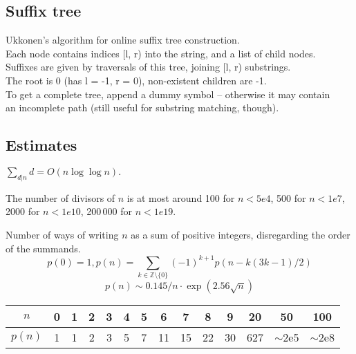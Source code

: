 \documentclass{article}
\begin{document}
  \subsection*{Suffix tree}
  Ukkonen's algorithm for online suffix tree construction.
\\Each node contains indices [l, r) into the string, and a list of child nodes.
\\Suffixes are given by traversals of this tree, joining [l, r) substrings.
\\The root is 0 (has l = -1, r = 0), non-existent children are -1.
\\To get a complete tree, append a dummy symbol -- otherwise it may contain
\\an incomplete path (still useful for substring matching, though).
    


\subsection*{Estimates}

\begin{multicols}{2}
	$\sum_{d|n} d = O(n \log \log n).$
	
	The number of divisors of $n$ is at most around 100 for $n < 5e4$, 500 for $n < 1e7$, 2000 for $n < 1e10$, 200\,000 for $n < 1e19$.
	
	\columnbreak
	
	Number of ways of writing $n$ as a sum of positive integers, disregarding the order of the summands.
	$$ p(0) = 1,  p(n) = \sum_{k \in \mathbb{Z} \setminus \{0\}} (-1)^{k+1} p(n - k(3k-1) / 2) $$
	\[ p(n) \sim 0.145 / n \cdot \exp(2.56 \sqrt{n}) \]
	
	\begin{center}
		\begin{tabular}{c|c@{\ }c@{\ }c@{\ }c@{\ }c@{\ }c@{\ }c@{\ }c@{\ }c@{\ }c@{\ }c@{\ }c@{\ }c}
			$n$    & 0 & 1 & 2 & 3 & 4 & 5 & 6  & 7  & 8  & 9  & 20  & 50  & 100 \\ \hline
			$p(n)$ & 1 & 1 & 2 & 3 & 5 & 7 & 11 & 15 & 22 & 30 & 627 & $\mathtt{\sim}$2e5 & $\mathtt{\sim}$2e8 \\
		\end{tabular}
	\end{center}
	
\end{multicols}
\end{document}

